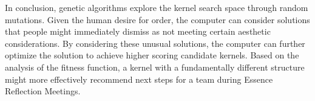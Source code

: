 \documentclass[3p,times,procedia]{elsarticle}
\begin{document}
In conclusion, genetic algorithms explore the kernel search space through random mutations. Given the human desire for order, the computer can consider solutions that people might immediately dismiss as not meeting certain aesthetic considerations. By considering these unusual solutions, the computer can further optimize the solution to achieve higher scoring candidate kernels. Based on the analysis of the fitness function, a kernel with a fundamentally different structure might more effectively recommend next steps for a team during Essence Reflection Meetings.






\end{document}
